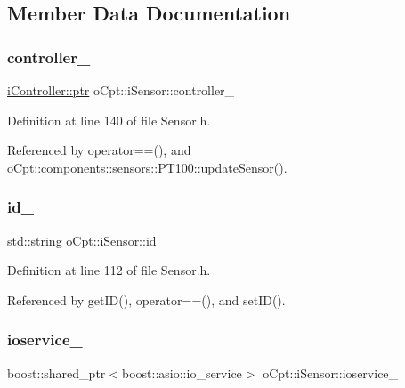 \subsection{Member Data Documentation}
\hypertarget{classo_cpt_1_1i_sensor_a65e41d8be53d71b1db21bac89c5c3c0d}{}\label{classo_cpt_1_1i_sensor_a65e41d8be53d71b1db21bac89c5c3c0d} 
\subsubsection{\texorpdfstring{controller\+\_\+}{controller\_}}
{\footnotesize\ttfamily \hyperlink{classo_cpt_1_1i_controller_a6d89a95cd6ad68bb74adfaca2f36370f}{i\+Controller\+::ptr} o\+Cpt\+::i\+Sensor\+::controller\+\_\+\hspace{0.3cm}{\ttfamily [protected]}}



Definition at line 140 of file Sensor.\+h.



Referenced by operator==(), and o\+Cpt\+::components\+::sensors\+::\+P\+T100\+::update\+Sensor().

\hypertarget{classo_cpt_1_1i_sensor_a4c9bd54d193ec8f2cc01eede5eadacdc}{}\label{classo_cpt_1_1i_sensor_a4c9bd54d193ec8f2cc01eede5eadacdc} 
\subsubsection{\texorpdfstring{id\+\_\+}{id\_}}
{\footnotesize\ttfamily std\+::string o\+Cpt\+::i\+Sensor\+::id\+\_\+\hspace{0.3cm}{\ttfamily [protected]}}



Definition at line 112 of file Sensor.\+h.



Referenced by get\+I\+D(), operator==(), and set\+I\+D().

\hypertarget{classo_cpt_1_1i_sensor_a7aa3b0cea67ca97dae2495a20f5f6a04}{}\label{classo_cpt_1_1i_sensor_a7aa3b0cea67ca97dae2495a20f5f6a04} 
\subsubsection{\texorpdfstring{ioservice\+\_\+}{ioservice\_}}
{\footnotesize\ttfamily boost\+::shared\+\_\+ptr$<$boost\+::asio\+::io\+\_\+service$>$ o\+Cpt\+::i\+Sensor\+::ioservice\+\_\+\hspace{0.3cm}{\ttfamily [protected]}}



